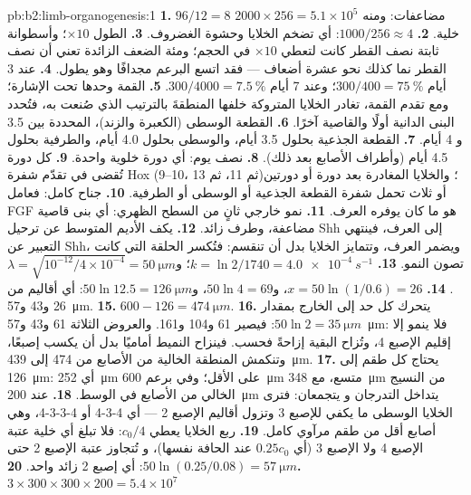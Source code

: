 \begin{solution}{pb:b2:limb-organogenesis:1}
\textbf{1.} $96/12 = 8$ مضاعفات: ومنه $2000\times 256 = 5.1\times 10^{5}$
خلية.
\textbf{2.} $1000/256 \approx 4$: أي تضخم الخلايا وحشوة الغضروف.
\textbf{3.} الطول $\times 10$؛ وأسطوانة ثابتة نصف القطر كانت
لتعطي $\times 10$ في الحجم؛ ومئة الضعف الزائدة تعني أن نصف القطر
نما كذلك نحو عشرة أضعاف --- فقد اتسع البرعم مجدافًا وهو
يطول.
\textbf{4.} عند 3 أيام $300/400 = \qty{75}{\%}$؛ وعند 7 أيام $300/4000 =
\qty{7.5}{\%}$.
\textbf{5.} القمة وحدها تحت الإشارة؛ ومع تقدم القمة،
تغادر الخلايا المتروكة خلفها المنطقةَ بالترتيب الذي صُنعت به، فتُحدد
البنى الدانية أولًا والقاصية آخرًا.
\textbf{6.} القطعة الوسطى (الكعبرة والزند)، المحددة بين 3.5 و
4 أيام.
\textbf{7.} القطعة الجذعية بحلول 3.5 أيام، والوسطى بحلول 4.0 أيام، والطرفية بحلول 4.5
أيام (وأطراف الأصابع بعد ذلك).
\textbf{8.} نصف يوم: أي دورة خلوية واحدة.
\textbf{9.} كل دورة تُقضى في  تقدّم شفرة
Hox (9--10، ثم 11، ثم 13)؛ والخلايا المغادرة بعد دورة أو دورتين أو
ثلاث تحمل شفرة القطعة الجذعية أو الوسطى أو الطرفية.
\textbf{10.} جناح كامل: فعامل FGF هو ما كان يوفره العرف.
\textbf{11.} نمو خارجي ثانٍ من السطح الظهري: أي بنى قاصية
مضاعفة، وطرف زائد.
\textbf{12.} يكف الأديم المتوسط عن ترحيل Shh إلى العرف، فينتهي التعبير
عن Shh، ويضمر العرف، وتتمايز الخلايا
بدل أن تنقسم: فتُكسر الحلقة التي كانت تصون النمو.
\textbf{13.} $k = \ln 2/1740 = \qty{4.0e-4}{s^{-1}}$؛ و$\lambda =
\sqrt{10^{-12}/4\times 10^{-4}} = \qty{50}{\micro m}$.
\textbf{14.} $x = 50\ln(1/0.6) = 26$، و$50\ln 4 = 69$، و$50\ln 12.5 =
\qty{126}{\micro m}$: أي أقاليم من 26 و43 و\qty{57}{\micro m}.
\textbf{15.} $600 - 126 = \qty{474}{\micro m}$.
\textbf{16.} يتحرك كل حد إلى الخارج بمقدار $50\ln 2 = \qty{35}{\micro
m}$: فيصير 61 و104 و161. والعروض الثلاثة 61 و43 و\qty{57}{\micro m}:
فلا ينمو إلا إقليم الإصبع 4، وتُزاح البقية إزاحةً فحسب.
فينزاح النميط أماميًا بدل أن يكسب إصبعًا، وتنكمش
المنطقة الخالية من الأصابع من 474 إلى \qty{439}{\micro m}.
\textbf{17.} يحتاج كل طقم إلى \qty{126}{\micro m}: أي
\qty{252}{\micro m} على الأقل؛ وفي برعم \qty{600}{\micro m} متسع، مع
\qty{348}{\micro m} من النسيج الخالي من الأصابع في الوسط.
\textbf{18.} عند \qty{200}{\micro m} يتداخل التدرجان و
يتجمعان: فترى الخلايا الوسطى ما يكفي للإصبع 3 وتزول أقاليم
الإصبع 2 --- أي 4-3-4 أو 4-3-3-4، وهي أصابع أقل من طقم
مرآوي كامل.
\textbf{19.} ربع الخلايا يعطي $c_0/4$: فلا تبلغ أي خلية
عتبة الإصبع 4 ولا الإصبع 3 (أي $0.25 c_0$ عند الحافة نفسها)، و
تُتجاوز عتبة الإصبع 2 حتى $50\ln(0.25/0.08) =
\qty{57}{\micro m}$: أي إصبع 2 زائد واحد.
\textbf{20.} $3\times 300\times 300\times 200 = 5.4\times 10^{7}$

\end{solution}
